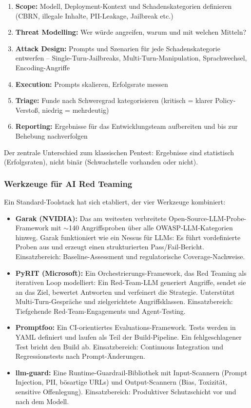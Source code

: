 \begin{enumerate}[leftmargin=*]
    \item \textbf{Scope:} Modell, Deployment-Kontext und Schadenskategorien definieren (CBRN, illegale Inhalte, PII-Leakage, Jailbreak etc.)
    \item \textbf{Threat Modelling:} Wer würde angreifen, warum und mit welchen Mitteln?
    \item \textbf{Attack Design:} Prompts und Szenarien für jede Schadenskategorie entwerfen -- Single-Turn-Jailbreaks, Multi-Turn-Manipulation, Sprachwechsel, Encoding-Angriffe
    \item \textbf{Execution:} Prompts skalieren, Erfolgsrate messen
    \item \textbf{Triage:} Funde nach Schweregrad kategorisieren (kritisch = klarer Policy-Verstoß, niedrig = mehrdeutig)
    \item \textbf{Reporting:} Ergebnisse für das Entwicklungsteam aufbereiten und bis zur Behebung nachverfolgen
\end{enumerate}

Der zentrale Unterschied zum klassischen Pentest: Ergebnisse sind statistisch (Erfolgsraten), nicht binär (Schwachstelle vorhanden oder nicht).

\subsubsection*{Werkzeuge für AI Red Teaming}

Ein Standard-Toolstack hat sich etabliert, der vier Werkzeuge kombiniert:

\begin{itemize}[leftmargin=*]
    \item \textbf{Garak (NVIDIA):} Das am weitesten verbreitete Open-Source-LLM-Probe-Framework mit $\sim$140 Angriffsproben über alle OWASP-LLM-Kategorien hinweg. Garak funktioniert wie ein Nessus für LLMs: Es führt vordefinierte Proben aus und erzeugt einen strukturierten Pass/Fail-Bericht. Einsatzbereich: Baseline-Assessment und regulatorische Coverage-Nachweise.
    \item \textbf{PyRIT (Microsoft):} Ein Orchestrierungs-Framework, das Red Teaming als iterativen Loop modelliert: Ein Red-Team-LLM generiert Angriffe, sendet sie an das Ziel, bewertet Antworten und verfeinert die Strategie. Unterstützt Multi-Turn-Gespräche und zielgerichtete Angriffsklassen. Einsatzbereich: Tiefgehende Red-Team-Engagements und Agent-Testing.
    \item \textbf{Promptfoo:} Ein CI-orientiertes Evaluations-Framework. Tests werden in YAML definiert und laufen als Teil der Build-Pipeline. Ein fehlgeschlagener Test bricht den Build ab. Einsatzbereich: Continuous Integration und Regressionstests nach Prompt-Änderungen.
    \item \textbf{llm-guard:} Eine Runtime-Guardrail-Bibliothek mit Input-Scannern (Prompt Injection, PII, bösartige URLs) und Output-Scannern (Bias, Toxizität, sensitive Offenlegung). Einsatzbereich: Produktiver Schutzschicht vor und nach dem Modell.
\end{itemize}

